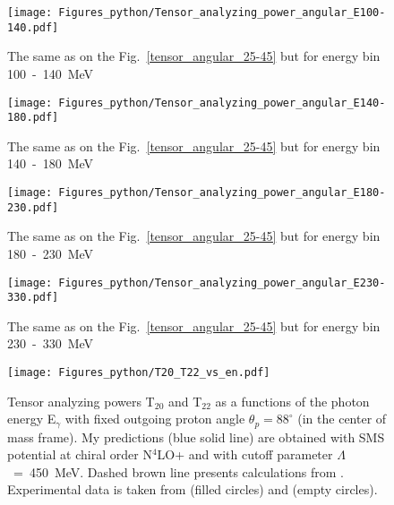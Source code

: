     \begin{figure}[h]
        \begin{center}
        \texttt{[image: Figures\_python/Tensor\_analyzing\_power\_angular\_E100-140.pdf]}
        \end{center}
        \caption{The same as on the Fig.~\ref*{tensor_angular_25-45} but for energy bin 100~-~140~MeV}
        \label{tensor_angular_100-140}
    \end{figure}
        
        

    \begin{figure}[h]
        \begin{center}
        \texttt{[image: Figures\_python/Tensor\_analyzing\_power\_angular\_E140-180.pdf]}
        \end{center}
        \caption{The same as on the Fig.~\ref*{tensor_angular_25-45} but for energy bin 140~-~180~MeV}
        \label{tensor_angular_140-180}
    \end{figure}
        

    \begin{figure}[h]
        \begin{center}
        \texttt{[image: Figures\_python/Tensor\_analyzing\_power\_angular\_E180-230.pdf]}
        \end{center}
        \caption{The same as on the Fig.~\ref*{tensor_angular_25-45} but for energy bin 180~-~230~MeV}
        \label{tensor_angular_180-230}
    \end{figure}

    \begin{figure}[h]
        \begin{center}
        \texttt{[image: Figures\_python/Tensor\_analyzing\_power\_angular\_E230-330.pdf]}
        \end{center}
        \caption{The same as on the Fig.~\ref*{tensor_angular_25-45} but for energy bin 230~-~330~MeV}
        \label{tensor_angular_230-330}
    \end{figure}
        


    \begin{figure}[h]
        \begin{center}
        \texttt{[image: Figures\_python/T20\_T22\_vs\_en.pdf]}
        \end{center}
        \caption{Tensor analyzing powers T$_{20}$ and T$_{22}$ as a functions of the photon energy E$_\gamma$
        with fixed outgoing proton angle $\theta_p = 88^{\circ}$ (in the center of mass frame).
        My predictions (blue solid line) are obtained with SMS potential at chiral order N$^4$LO+
        and with cutoff parameter $\Lambda$~=~450~MeV.
        Dashed brown line presents calculations from \cite{Schmitt1989}.
        Experimental data is taken from \cite{rachek2007} (filled circles)
        and \cite{mishev1993} (empty circles).}
        \label{T20_vs_en}
    \end{figure}

